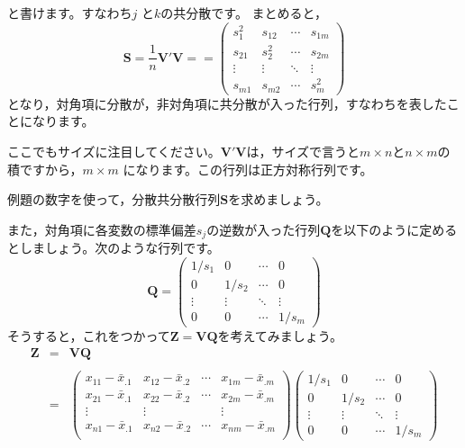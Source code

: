 \documentclass{ltjsbook}
\begin{document}
と書けます。すなわち$j$ と$k$の共分散です。
まとめると，
\[ \bm{S} = \frac{1}{n}\bm{V}'\bm{V} =
	= \begin{pmatrix}
		s_1^2  & s_{12} & \cdots & s_{1m} \\
		s_{21} & s_2^2  & \cdots & s_{2m} \\
		\vdots & \vdots & \ddots & \vdots \\
		s_{m1} & s_{m2} & \cdots & s_m^2\end{pmatrix}
\]
となり，対角項に分散が，非対角項に共分散が入った行列，すなわちを表したことになります。

ここでもサイズに注目してください。$\bm{V}'\bm{V}$は，サイズで言うと$m \times n$と$n \times m$の積ですから，$m \times m$ になります。この行列は正方対称行列です。

\begin{reidai}{}{}
	例題の数字を使って，分散共分散行列$\bm{S}$を求めましょう。
\end{reidai}


また，対角項に各変数の標準偏差$s_j$の逆数が入った行列$\bm{Q}$を以下のように定めるとしましょう。次のような行列です。
\[ \bm{Q} = \begin{pmatrix} 1/s_1  & 0      & \cdots & 0      \\
                0      & 1/s_2  & \cdots & 0      \\
                \vdots & \vdots & \ddots & \vdots \\
                0      & 0      & \cdots & 1/s_m\end{pmatrix} \]
そうすると，これをつかって$\bm{Z}=\bm{VQ}$を考えてみましょう。
\[
	\begin{array}{ccl}
		\bm{Z} & = & \bm{V} \bm{Q}                                                                  \\
		       &   &                                                                                \\
		       & = & \begin{pmatrix}
			             x_{11} - \bar{x}_{.1} & x_{12} - \bar{x}_{.2} & \cdots & x_{1m} - \bar{x}_{.m} \\
			             x_{21} - \bar{x}_{.1} & x_{22} - \bar{x}_{.2} & \cdots & x_{2m} - \bar{x}_{.m} \\
			             \vdots                & \vdots                &        & \vdots                \\
			             x_{n1} - \bar{x}_{.1} & x_{n2} - \bar{x}_{.2} & \cdots & x_{nm} - \bar{x}_{.m} \\
		             \end{pmatrix}
		\begin{pmatrix} 1/s_1  & 0      & \cdots & 0      \\
                0      & 1/s_2  & \cdots & 0      \\
                \vdots & \vdots & \ddots & \vdots \\
                0      & 0      & \cdots & 1/s_m
		\end{pmatrix}
	\end{array}
\]
\end{document}
